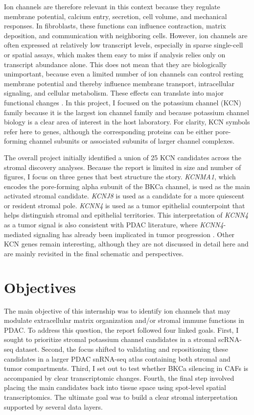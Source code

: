 \documentclass[11pt,a4paper]{article}
\begin{document}
Ion channels are therefore relevant in this context because they regulate membrane potential, calcium entry, secretion, cell volume, and mechanical responses. In fibroblasts, these functions can influence contraction, matrix deposition, and communication with neighboring cells. However, ion channels are often expressed at relatively low transcript levels, especially in sparse single-cell or spatial assays, which makes them easy to miss if analysis relies only on transcript abundance alone. This does not mean that they are biologically unimportant, because even a limited number of ion channels can control resting membrane potential and thereby influence membrane transport, intracellular signaling, and cellular metabolism. These effects can translate into major functional changes \citep{scruggs2020,jiang2019}. In this project, I focused on the potassium channel (KCN) family because it is the largest ion channel family and because potassium channel biology is a clear area of interest in the host laboratory. For clarity, KCN symbols refer here to genes, although the corresponding proteins can be either pore-forming channel subunits or associated subunits of larger channel complexes.

The overall project initially identified a union of 25 KCN candidates across the stromal discovery analyses. Because the report is limited in size and number of figures, I focus on three genes that best structure the story. \textit{KCNMA1}, which encodes the pore-forming alpha subunit of the BKCa channel, is used as the main activated stromal candidate. \textit{KCNJ8} is used as a candidate for a more quiescent or resident stromal pole. \textit{KCNN4} is used as a tumor epithelial counterpoint that helps distinguish stromal and epithelial territories. This interpretation of \textit{KCNN4} as a tumor signal is also consistent with PDAC literature, where \textit{KCNN4}-mediated signaling has already been implicated in tumor progression \citep{jiang2019}. Other KCN genes remain interesting, although they are not discussed in detail here and are mainly revisited in the final schematic and perspectives.

\section{Objectives}
The main objective of this internship was to identify ion channels that may modulate extracellular matrix organization and/or stromal immune functions in PDAC. To address this question, the report followed four linked goals. First, I sought to prioritize stromal potassium channel candidates in a stromal scRNA-seq dataset. Second, the focus shifted to validating and repositioning these candidates in a larger PDAC snRNA-seq atlas containing both stromal and tumor compartments. Third, I set out to test whether BKCa silencing in CAFs is accompanied by clear transcriptomic changes. Fourth, the final step involved placing the main candidates back into tissue space using spot-level spatial transcriptomics. The ultimate goal was to build a clear stromal interpretation supported by several data layers.
\end{document}
